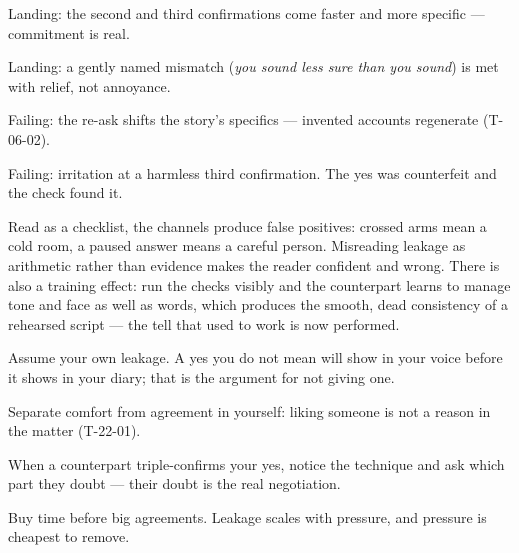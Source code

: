 \begin{feedback}
  \item Landing: the second and third confirmations come faster and more specific --- commitment is real.
  \item Landing: a gently named mismatch (\emph{you sound less sure than you sound}) is met with relief, not annoyance.
  \item Failing: the re-ask shifts the story's specifics --- invented accounts regenerate (T-06-02).
  \item Failing: irritation at a harmless third confirmation. The yes was counterfeit and the check found it.
\end{feedback}
\begin{failure}
Read as a checklist, the channels produce false positives: crossed arms mean a cold room, a paused answer means a careful person. Misreading leakage as arithmetic rather than evidence makes the reader confident and wrong. There is also a training effect: run the checks visibly and the counterpart learns to manage tone and face as well as words, which produces the smooth, dead consistency of a rehearsed script --- the tell that used to work is now performed.
\end{failure}
\begin{countermeasures}
  \item Assume your own leakage. A yes you do not mean will show in your voice before it shows in your diary; that is the argument for not giving one.
  \item Separate comfort from agreement in yourself: liking someone is not a reason in the matter (T-22-01).
  \item When a counterpart triple-confirms your yes, notice the technique and ask which part they doubt --- their doubt is the real negotiation.
  \item Buy time before big agreements. Leakage scales with pressure, and pressure is cheapest to remove.
\end{countermeasures}

\seesources
{}
